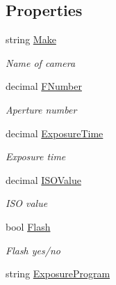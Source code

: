 \subsection*{Properties}
\begin{DoxyCompactItemize}
\item 
string \mbox{\hyperlink{class_pic_d_b_1_1_models_1_1_e_x_i_f_view_model_a592d05bc9267be0fc9a5419b15c7fd9a}{Make}}
\begin{DoxyCompactList}\small\item\em Name of camera \end{DoxyCompactList}\item 
decimal \mbox{\hyperlink{class_pic_d_b_1_1_models_1_1_e_x_i_f_view_model_a755f8dd35bd339a840b2625bc34447c3}{F\+Number}}
\begin{DoxyCompactList}\small\item\em Aperture number \end{DoxyCompactList}\item 
decimal \mbox{\hyperlink{class_pic_d_b_1_1_models_1_1_e_x_i_f_view_model_af614f441214af4b84bee0c8eb21a621e}{Exposure\+Time}}
\begin{DoxyCompactList}\small\item\em Exposure time \end{DoxyCompactList}\item 
decimal \mbox{\hyperlink{class_pic_d_b_1_1_models_1_1_e_x_i_f_view_model_a9faba92b9bb54e4a318c16cb3a43eedc}{I\+S\+O\+Value}}
\begin{DoxyCompactList}\small\item\em I\+SO value \end{DoxyCompactList}\item 
bool \mbox{\hyperlink{class_pic_d_b_1_1_models_1_1_e_x_i_f_view_model_ae20aabe650d1cc516922aa3e8c90026b}{Flash}}
\begin{DoxyCompactList}\small\item\em Flash yes/no \end{DoxyCompactList}\item 
string \mbox{\hyperlink{class_pic_d_b_1_1_models_1_1_e_x_i_f_view_model_ade68c50e8a7c5353c5c045b03a2d3e9a}{Exposure\+Program}}

\end{DoxyCompactItemize}
